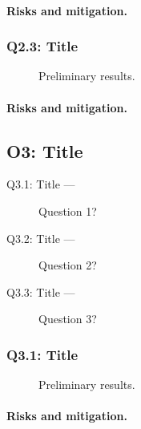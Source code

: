 \documentclass{nsf}
\begin{document}
\paragraph{Risks and mitigation.}
\lipsum[4]

\subsubsection{Q2.3: Title}
\label{sec:q23}

\begin{wrapfigure}[14]{r}{.5\textwidth}
  \centering
  \caption{Preliminary results.}
  \label{fig:q23fig}
\end{wrapfigure}
\lipsum[1-3]
\paragraph{Risks and mitigation.}
\lipsum[4]

\subsection{O3: Title}
\label{sec:o3}

\lipsum[1]

\begin{questions}
  \begin{description}
  \item[Q3.1: Title —] Question 1?
  \item[Q3.2: Title —] Question 2?
  \item[Q3.3: Title —] Question 3?
  \end{description}
\end{questions}

\subsubsection{Q3.1: Title}
\label{sec:q31}

\begin{wrapfigure}[14]{r}{.5\textwidth}
  \centering
  \caption{Preliminary results.}
  \label{fig:q31fig}
\end{wrapfigure}
\lipsum[1-3]
\paragraph{Risks and mitigation.}
\lipsum[4]
\end{document}
